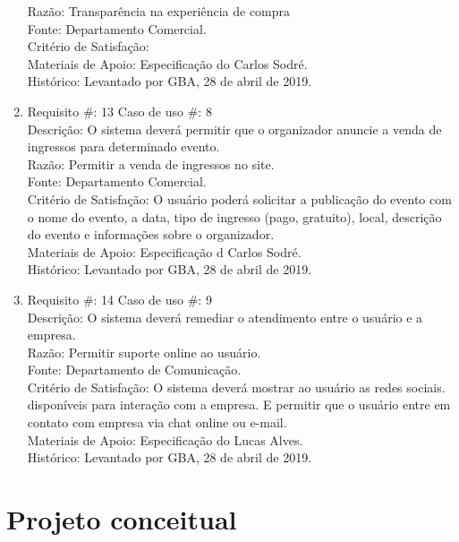 \documentclass[12pt]{article}
\begin{document}
\begin{enumerate}
                    Razão: Transparência na experiência de compra\\
                    Fonte: Departamento Comercial.\\
                    Critério de Satisfação: \\
                    Materiais de Apoio: Especificação do Carlos Sodré.\\
                    Histórico: Levantado por GBA, 28 de abril de 2019.\\
                \item Requisito \#: 13 Caso de uso \#: 8\\
                    Descrição: O sistema deverá permitir que o organizador anuncie a venda de ingressos para determinado evento. \\
                    Razão: Permitir a venda de ingressos no site. \\
                    Fonte: Departamento Comercial.\\
                    Critério de Satisfação: O usuário poderá solicitar a publicação do evento com o nome do evento, a data, tipo de ingresso (pago, gratuito), local, descrição do evento e informações sobre o organizador.  \\
                    Materiais de Apoio: Especificação d Carlos Sodré.\\
                    Histórico: Levantado por GBA, 28 de abril de 2019.\\
                \item Requisito \#: 14 Caso de uso \#: 9\\
                    Descrição: O sistema deverá remediar o atendimento entre o usuário e a empresa. \\
                    Razão: Permitir suporte online ao usuário. \\
                    Fonte: Departamento de Comunicação.\\
                    Critério de Satisfação: O sistema deverá mostrar ao usuário as redes sociais. disponíveis para interação com a empresa. E permitir que o usuário entre em contato com empresa via chat online ou e-mail.\\
                    Materiais de Apoio: Especificação do Lucas Alves.\\
                    Histórico: Levantado por GBA, 28 de abril de 2019.\\
           \end{enumerate}

    \section{Projeto conceitual}
\end{document}

